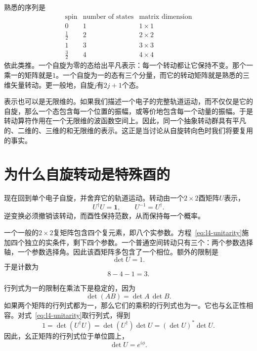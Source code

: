 熟悉的序列是
\begin{equation}
\begin{array}{c|c|c}
\text{spin} & \text{number of states} & \text{matrix dimension}\\
\hline
0 & 1 & 1\times1\\
\frac12 & 2 & 2\times2\\
1 & 3 & 3\times3\\
\frac32 & 4 & 4\times4
\end{array}
\end{equation}
依此类推。一个自旋为零的态给出平凡表示：每一个转动都让它保持不变。那个一乘一的矩阵就是\(1\)。一个自旋为一的态有三个分量，而它的转动矩阵就是熟悉的三维矢量转动。更一般地，自旋\(j\)有\(2j+1\)个态。

表示也可以是无限维的。如果我们描述一个电子的完整轨道运动，而不仅仅是它的自旋，那么一个态包含每一个位置的振幅，或等价地包含每一个动量的振幅。于是转动算符作用在一个无限维的波函数空间上。因此，同一个抽象转动群具有平凡的、二维的、三维的和无限维的表示。这正是当讨论从自旋转向色时我们将要复用的事实。

\section{为什么自旋转动是特殊酉的}

现在回到单个电子自旋，并舍弃它的轨道运动。转动由一个\(2\times2\)酉矩阵\(U\)表示，
\begin{equation}
U^\dagger U=\boldsymbol 1,
\qquad
U^{-1}=U^\dagger.
\label{eq:l4-unitarity}
\end{equation}
逆变换必须撤销该转动，而酉性保持范数，从而保持每一个概率。

一个一般的\(2\times2\)复矩阵包含四个复元素，即八个实参数。方程~\eqref{eq:l4-unitarity}施加四个独立的实条件，剩下四个参数。一个普通空间转动只有三个：两个参数选择轴，一个参数选择角。因此该酉矩阵多包含了一个相位。额外的限制是
\begin{equation}
\det U=1.
\label{eq:l4-det-one}
\end{equation}
于是计数为
\begin{equation}
8-4-1=3.
\end{equation}

行列式为一的限制在乘法下是稳定的，因为
\begin{equation}
\det(AB)=\det A\,\det B.
\end{equation}
如果两个矩阵的行列式都为一，那么它们的乘积的行列式也为一。它也与幺正性相容。对式~\eqref{eq:l4-unitarity}取行列式，得到
\begin{equation}
1=\det(U^\dagger U)
=\det(U^\dagger)\det U
=(\det U)^*\det U.
\end{equation}
因此，幺正矩阵的行列式位于单位圆上，
\begin{equation}
\det U=e^{i\phi}.
\end{equation}

